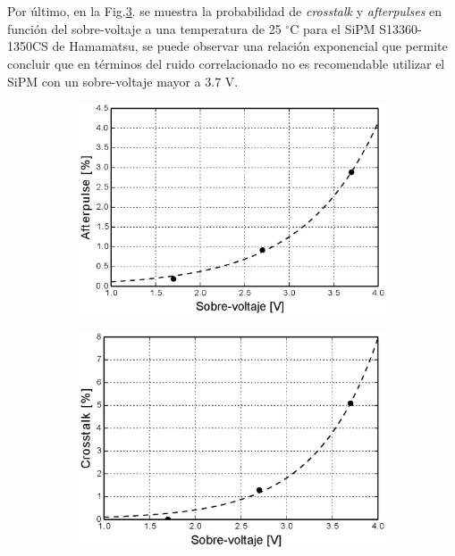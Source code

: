 \\ \\
Por último, en la Fig.\ref{fig:Noise_vs_Ov}. se muestra la probabilidad de \textit{crosstalk} y  \textit{afterpulses} en función del sobre-voltaje a una temperatura de 25 $^\circ$C para el SiPM S13360-1350CS de Hamamatsu, se puede observar una relación exponencial que permite concluir que en términos del ruido correlacionado no es recomendable utilizar el SiPM con un sobre-voltaje mayor a $3.7$ V.

\begin{figure}[ht!]
     \centering
        \caption{Probabilidad de \textit{afterpulse} (izquierda) y \textit{crosstalk} (derecha) para sobre voltajes de $1.7$ V, $2.7$ V y $3.7$ V para el SiPM S13360-1350CS de Hamamatsu.}
     \begin{subfigure}[b]{0.49\textwidth}
         \centering
         \includegraphics[width=1.1\textwidth]{Images/After_vs_Ov_1350CS.eps}
         \label{fig:After_vs_Ov}
     \end{subfigure}
     \begin{subfigure}[b]{0.49\textwidth}
         \centering
         \includegraphics[width=1.1\textwidth]{Images/Cross_vs_Ov_1350CS.eps}
         \label{fig:Cross_vs_Ov}
     \end{subfigure}
        \label{fig:Noise_vs_Ov}
\end{figure}